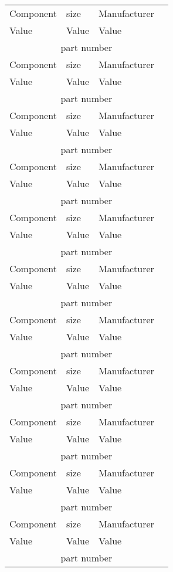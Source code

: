 \documentclass[9pt]{memoir} %
\begin{document}
\vspace{-0.17in}
\hspace{-0.25in}
\begin{tabular}{l l l l }

Component & size & Manufacturer\\
Value & Value & Value &  \\
\multicolumn{4}{c}{part number}\\[\sep]

Component & size & Manufacturer\\
Value & Value & Value &  \\
\multicolumn{4}{c}{part number}\\[\jump]

Component & size & Manufacturer\\
Value & Value & Value &  \\
\multicolumn{4}{c}{part number}\\[\jump]

Component & size & Manufacturer\\
Value & Value & Value &  \\
\multicolumn{4}{c}{part number}\\[\jump]

Component & size & Manufacturer\\
Value & Value & Value &  \\
\multicolumn{4}{c}{part number}\\[\jump]

Component & size & Manufacturer\\
Value & Value & Value &  \\
\multicolumn{4}{c}{part number}\\[\jump]

Component & size & Manufacturer\\
Value & Value & Value &  \\
\multicolumn{4}{c}{part number}\\[\jump]

Component & size & Manufacturer\\
Value & Value & Value &  \\
\multicolumn{4}{c}{part number}\\[\jump]

Component & size & Manufacturer\\
Value & Value & Value &  \\
\multicolumn{4}{c}{part number}\\[\jump]

Component & size & Manufacturer\\
Value & Value & Value &  \\
\multicolumn{4}{c}{part number}\\[\jump]

Component & size & Manufacturer\\
Value & Value & Value &  \\
\multicolumn{4}{c}{part number}\\[\jump]

\end{tabular}
\end{document}
